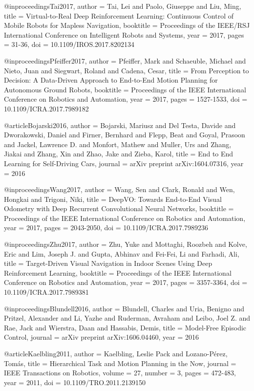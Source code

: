 @inproceedings{Tai2017,
  author = {Tai, Lei and Paolo, Giuseppe and Liu, Ming},
  title = {Virtual-to-Real Deep Reinforcement Learning: Continuous Control of Mobile Robots for Mapless Navigation},
  booktitle = {Proceedings of the IEEE/RSJ International Conference on Intelligent Robots and Systems},
  year = {2017},
  pages = {31-36},
  doi = {10.1109/IROS.2017.8202134}
}

@inproceedings{Pfeiffer2017,
  author = {Pfeiffer, Mark and Schaeuble, Michael and Nieto, Juan and Siegwart, Roland and Cadena, Cesar},
  title = {From Perception to Decision: A Data-Driven Approach to End-to-End Motion Planning for Autonomous Ground Robots},
  booktitle = {Proceedings of the IEEE International Conference on Robotics and Automation},
  year = {2017},
  pages = {1527-1533},
  doi = {10.1109/ICRA.2017.7989182}
}

@article{Bojarski2016,
  author = {Bojarski, Mariusz and Del Testa, Davide and Dworakowski, Daniel and Firner, Bernhard and Flepp, Beat and Goyal, Prasoon and Jackel, Lawrence D. and Monfort, Mathew and Muller, Urs and Zhang, Jiakai and Zhang, Xin and Zhao, Jake and Zieba, Karol},
  title = {End to End Learning for Self-Driving Cars},
  journal = {arXiv preprint arXiv:1604.07316},
  year = {2016}
}

@inproceedings{Wang2017,
  author = {Wang, Sen and Clark, Ronald and Wen, Hongkai and Trigoni, Niki},
  title = {DeepVO: Towards End-to-End Visual Odometry with Deep Recurrent Convolutional Neural Networks},
  booktitle = {Proceedings of the IEEE International Conference on Robotics and Automation},
  year = {2017},
  pages = {2043-2050},
  doi = {10.1109/ICRA.2017.7989236}
}

@inproceedings{Zhu2017,
  author = {Zhu, Yuke and Mottaghi, Roozbeh and Kolve, Eric and Lim, Joseph J. and Gupta, Abhinav and Fei-Fei, Li and Farhadi, Ali},
  title = {Target-Driven Visual Navigation in Indoor Scenes Using Deep Reinforcement Learning},
  booktitle = {Proceedings of the IEEE International Conference on Robotics and Automation},
  year = {2017},
  pages = {3357-3364},
  doi = {10.1109/ICRA.2017.7989381}
}

@inproceedings{Blundell2016,
  author = {Blundell, Charles and Uria, Benigno and Pritzel, Alexander and Li, Yazhe and Ruderman, Avraham and Leibo, Joel Z. and Rae, Jack and Wierstra, Daan and Hassabis, Demis},
  title = {Model-Free Episodic Control},
  journal = {arXiv preprint arXiv:1606.04460},
  year = {2016}
}

@article{Kaelbling2011,
  author = {Kaelbling, Leslie Pack and Lozano-Pérez, Tomás},
  title = {Hierarchical Task and Motion Planning in the Now},
  journal = {IEEE Transactions on Robotics},
  volume = {27},
  number = {3},
  pages = {472-483},
  year = {2011},
  doi = {10.1109/TRO.2011.2139150}
}

